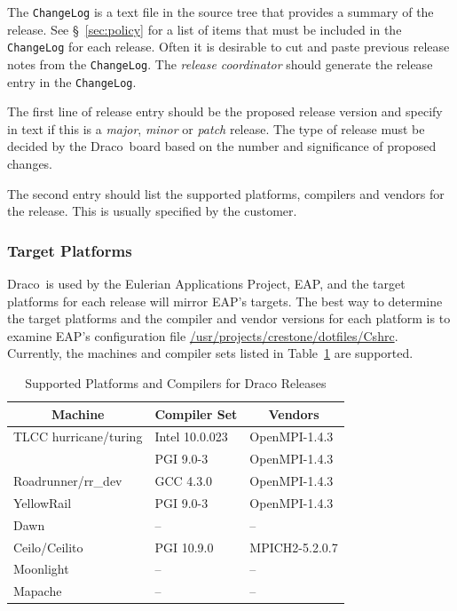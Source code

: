 \documentclass[note]{newmemo}
\newcommand{\draco}{{\normalfont\small\sffamily Draco}}
\begin{document}
The \texttt{ChangeLog} is a text file in the source tree that provides
a summary of the release.  See \S~\ref{sec:policy} for a list of items
that must be included in the \texttt{ChangeLog} for each release.
Often it is desirable to cut and paste previous release notes from
the \texttt{ChangeLog}.  The {\it release coordinator} should generate
the release entry in the \texttt{ChangeLog}.

The first line of release entry should be the proposed release version
and specify in text if this is a {\it major}, {\it minor} or {\it
  patch} release.  The type of release must be decided by the
\draco\ board based on the number and significance of proposed
changes.

The second entry should list the supported platforms, compilers and
vendors for the release.  This is usually specified by the customer.


\subsubsection{Target Platforms}
\label{sec:target_platforms}

\draco\ is used by the Eulerian Applications Project, EAP, and the
target platforms for each release will mirror EAP's targets.  The best
way to determine the target platforms and the compiler and vendor
versions for each platform is to examine EAP's configuration file
\url{/usr/projects/crestone/dotfiles/Cshrc}.  Currently, the machines
and compiler sets listed in Table~\ref{tab:supported_platforms} are
supported.
%
\begin{table}[ht]
  \caption{Supported Platforms and Compilers for Draco Releases}
  \label{tab:supported_platforms}
\begin{center}
\begin{tabular}{lll} \hline\hline
\multicolumn{1}{c}{Machine} & 
\multicolumn{1}{c}{Compiler Set} & 
\multicolumn{1}{c}{Vendors} \\ \hline
TLCC hurricane/turing & Intel 10.0.023 &  OpenMPI-1.4.3 \\
                      & PGI 9.0-3      &  OpenMPI-1.4.3 \\
Roadrunner/rr\_dev    & GCC 4.3.0      &  OpenMPI-1.4.3 \\
YellowRail            & PGI 9.0-3      &  OpenMPI-1.4.3 \\
Dawn                  & --             &  --             \\
Ceilo/Ceilito         & PGI 10.9.0     &  MPICH2-5.2.0.7 \\
Moonlight             & --             & --             \\
Mapache               & --             & --             \\
\hline\hline
\end{tabular}
\end{center}
\end{table}
\end{document}
